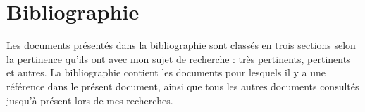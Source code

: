 \documentclass[12pt, letterpaper]{article} %
\begin{document}
\section{Bibliographie}
\label{s:biblio}
Les documents présentés dans la bibliographie sont classés en trois sections selon la pertinence qu'ils ont avec mon sujet de recherche : très pertinents, pertinents et autres. La bibliographie contient les documents pour lesquels il y a une référence dans le présent document, ainsi que tous les autres documents consultés jusqu'à présent lors de mes recherches. 



\end{document}
